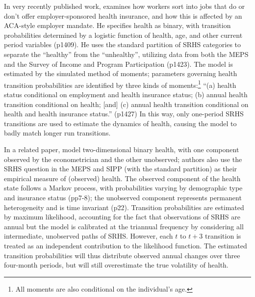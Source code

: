 \documentclass[12pt,pdftex,letterpaper]{article}
\begin{document}
In very recently published work, \cite{Aizawa19} examines how workers sort into jobs that do or don't offer employer-sponsored health insurance, and how this is affected by an ACA-style employer mandate.  He specifies health as binary, with transition probabilities determined by a logistic function of health, age, and other current period variables (p1409).  He uses the standard partition of SRHS categories to separate the ``healthy'' from the ``unhealthy'', utilizing data from both the MEPS and the Survey of Income and Program Participation (p1423).  The model is estimated by the simulated method of moments; parameters governing health transition probabilities are identified by three kinds of moments:\footnote{All moments are also conditional on the individual's age.} ``(a) health status conditional on employment and health insurance status; (b) annual health transition conditional on health; [and] (c) annual health transition conditional on health and health insurance status.'' (p1427) In this way, only one-period SRHS transitions are used to estimate the dynamics of health, causing the model to badly match longer run transitions.

In a related paper, \cite{AizawaFang18} model two-dimensional binary health, with one component observed by the econometrician and the other unobserved; authors also use the SRHS question in the MEPS and SIPP (with the standard partition) as their empirical measure of (observed) health.  The observed component of the health state follows a Markov process, with probabilities varying by demographic type and insurance status (pp7-8); the unobserved component represents permanent heterogeneity and is time invariant (p22).  Transition probabilities are estimated by maximum likelihood, accounting for the fact that observations of SRHS are annual but the model is calibrated at the triannual frequency by considering all intermediate, unobserved paths of SRHS.  However, each $t$ to $t+3$ transition is treated as an independent contribution to the likelihood function.  The estimated transition probabilities will thus distribute observed annual changes over three four-month periods, but will still overestimate the true volatility of health.
\end{document}
